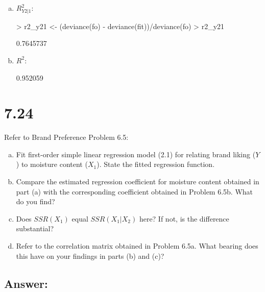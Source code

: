 \documentclass{article}
\begin{document}
\begin{enumerate}[a)]
\item{} $R_{Y2|1}^2$:

\begin{Schunk}
\begin{Sinput}
> r2_y21 <- (deviance(fo) - deviance(fit))/deviance(fo)
> r2_y21
\end{Sinput}
\begin{Soutput}
[1] 0.7645737
\end{Soutput}
\end{Schunk}

\item{} $R^2$:

\begin{Schunk}
\begin{Soutput}
[1] 0.952059
\end{Soutput}
\end{Schunk}

\end{enumerate}

\section{7.24}

Refer to Brand Preference Problem 6.5:

\begin{enumerate}[a)]
\item{} Fit first-order simple linear regression model (2.1) for relating brand liking ($Y$) to moisture content ($X_1$). State the fitted regression function.
\item{} Compare the estimated regression coefficient for moisture content obtained in part (a) with the corresponding coefficient obtained in Problem 6.5b. What do you find?
\item{} Does $SSR(X_1)$ equal $SSR(X_1|X_2)$ here? If not, is the difference substantial?
\item{} Refer to the correlation matrix obtained in Problem 6.5a. What bearing does this have on your findings in parts (b) and (c)?
\end{enumerate}

\subsection{Answer:}
\end{document}
